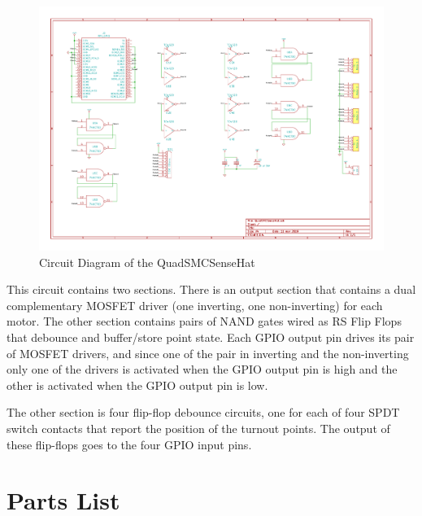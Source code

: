 \begin{figure}[hbpt]\begin{centering}%
\includegraphics[width=5in]{QuadSMCSenseHat.pdf}
\caption{Circuit Diagram of the QuadSMCSenseHat}
\end{centering}\end{figure}
This circuit contains two sections.  There is an output section that contains 
a dual complementary MOSFET driver (one inverting, one non-inverting) for each 
motor.  The other section contains pairs of NAND gates wired as RS Flip Flops 
that debounce and buffer/store point state.  Each GPIO output pin drives its 
pair of MOSFET drivers, and since one of the pair in inverting and the 
non-inverting only one of the drivers is activated when the GPIO output pin is 
high and the other is activated when the GPIO output pin is low.  

The other section is four flip-flop debounce circuits, one for each of four
SPDT switch contacts that report the position of the turnout points. The
output of these flip-flops goes to the four GPIO input pins.

\section{Parts List}

